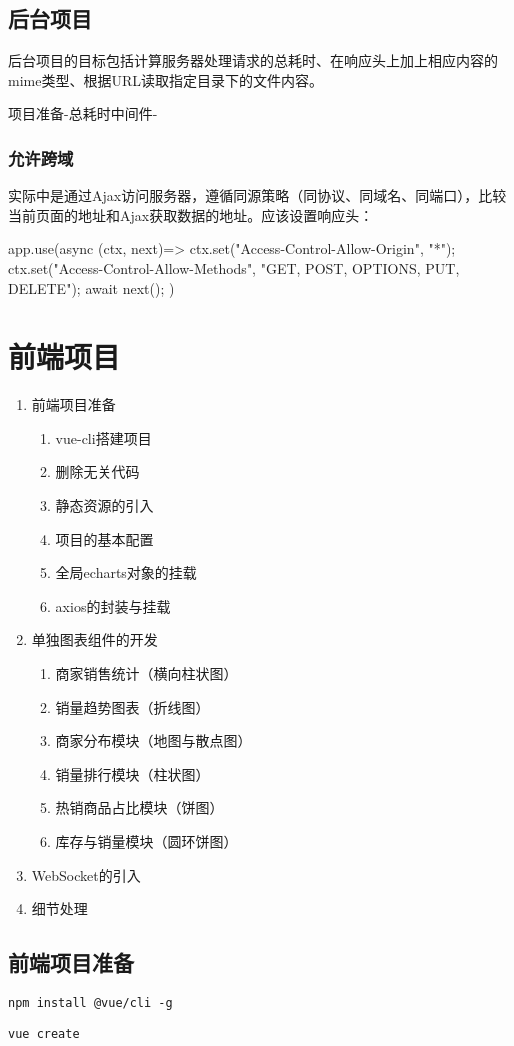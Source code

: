 \section{后台项目}
后台项目的目标包括计算服务器处理请求的总耗时、在响应头上加上相应内容的mime类型、根据URL读取指定目录下的文件内容。

项目准备-总耗时中间件-

\subsection{允许跨域}
实际中是通过Ajax访问服务器，遵循同源策略（同协议、同域名、同端口），比较当前页面的地址和Ajax获取数据的地址。应该设置响应头：
\begin{js}
app.use(async (ctx, next)=>{
    ctx.set("Access-Control-Allow-Origin", "*");
    ctx.set("Access-Control-Allow-Methods", "GET, POST, OPTIONS, PUT, DELETE");
    await next();
})
\end{js}

\chapter{前端项目}
\begin{enumerate}
    \item 前端项目准备
    \begin{enumerate}
        \item vue-cli搭建项目
        \item 删除无关代码
        \item 静态资源的引入
        \item 项目的基本配置
        \item 全局echarts对象的挂载
        \item axios的封装与挂载
    \end{enumerate}
    \item 单独图表组件的开发
    \begin{enumerate}
        \item 商家销售统计（横向柱状图）
        \item 销量趋势图表（折线图）
        \item 商家分布模块（地图与散点图）
        \item 销量排行模块（柱状图）
        \item 热销商品占比模块（饼图）
        \item 库存与销量模块（圆环饼图）
    \end{enumerate}
    \item WebSocket的引入
    \item 细节处理
\end{enumerate}

\section{前端项目准备}
\verb|npm install @vue/cli -g|

\verb|vue create|
